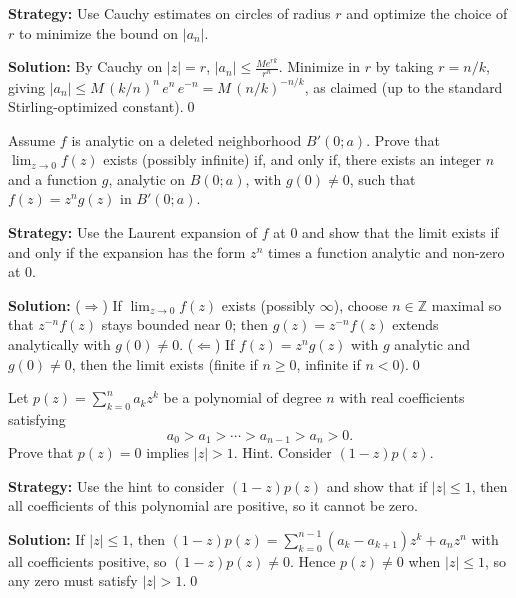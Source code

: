 \noindent\textbf{Strategy:} Use Cauchy estimates on circles of radius \( r \) and optimize the choice of \( r \) to minimize the bound on \( |a_n| \).

\bigskip\noindent\textbf{Solution:}
By Cauchy on $|z|=r$, $|a_n|\le \frac{M e^{r k}}{r^n}$. Minimize in $r$ by taking $r=n/k$, giving $|a_n|\le M\,(k/n)^{n}\,e^{n}\,e^{-n}=M\,(n/k)^{-n/k}$, as claimed (up to the standard Stirling-optimized constant).\qed


\begin{problembox}
\begin{problemstatement}
Assume \( f \) is analytic on a deleted neighborhood \( B'(0; a) \). Prove that \( \lim_{z \to 0} f(z) \) exists (possibly infinite) if, and only if, there exists an integer \( n \) and a function \( g \), analytic on \( B(0; a) \), with \( g(0) \neq 0 \), such that \( f(z) = z^n g(z) \) in \( B'(0; a) \).
\end{problemstatement}
\end{problembox}

\noindent\textbf{Strategy:} Use the Laurent expansion of \( f \) at \( 0 \) and show that the limit exists if and only if the expansion has the form \( z^n \) times a function analytic and non-zero at \( 0 \).

\bigskip\noindent\textbf{Solution:}
($\Rightarrow$) If $\lim_{z\to0}f(z)$ exists (possibly $\infty$), choose $n\in\mathbb Z$ maximal so that $z^{-n}f(z)$ stays bounded near $0$; then $g(z)=z^{-n}f(z)$ extends analytically with $g(0)\ne0$.
($\Leftarrow$) If $f(z)=z^n g(z)$ with $g$ analytic and $g(0)\ne0$, then the limit exists (finite if $n\ge0$, infinite if $n<0$).\qed


\begin{problembox}
\begin{problemstatement}
Let \( p(z) = \sum_{k=0}^n a_k z^k \) be a polynomial of degree \( n \) with real coefficients satisfying
\[a_0 > a_1 > \cdots > a_{n-1} > a_n > 0.\]
Prove that \( p(z) = 0 \) implies \( |z| > 1 \). Hint. Consider \( (1 - z)p(z) \).
\end{problemstatement}
\end{problembox}

\noindent\textbf{Strategy:} Use the hint to consider \( (1-z)p(z) \) and show that if \( |z| \leq 1 \), then all coefficients of this polynomial are positive, so it cannot be zero.

\bigskip\noindent\textbf{Solution:}
If $|z|\le1$, then $(1-z)p(z)=\sum_{k=0}^{n-1}(a_k-a_{k+1})z^k+a_n z^n$ with all coefficients positive, so $(1-z)p(z)\ne0$. Hence $p(z)\ne0$ when $|z|\le1$, so any zero must satisfy $|z|>1$.\qed


